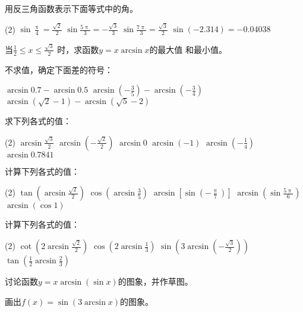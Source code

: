 \begin{Exercise}
\begin{question}
    \item 用反三角函数表示下面等式中的角。
\begin{tasks}(2)
    \task $\sin\frac{\uppi}{4}=\frac{\sqrt{2}}{2}$
    \task $\sin\frac{5\uppi}{3}=-\frac{\sqrt{3}}{3}$
    \task $\sin\frac{7\uppi}{3}=\frac{\sqrt{3}}{2}$
    \task $\sin(-2.314)=-0.04038$
\end{tasks}
    \item 当$\frac{1}{2}\leqslant x\le\frac{\sqrt{3}}{2}$
    时，求函数$y=x\arcsin x$的最大值
    和最小值。
    \item 不求值，确定下面差的符号：
\begin{tasks}
    \task $\arcsin 0.7-\arcsin 0.5$
    \task $\arcsin\left(-\frac{3}{5}\right)-\arcsin\left(-\frac{3}{4}\right)$
    \task $\arcsin\left(\sqrt{2}-1\right)-\arcsin\left(\sqrt{5}-2\right)$
\end{tasks}
\item 求下列各式的值：
\begin{tasks}(2)
    \task $\arcsin\frac{\sqrt{3}}{2}$
    \task $\arcsin\left(-\frac{\sqrt{2}}{2}\right)$
    \task $\arcsin0$
    \task $\arcsin(-1)$
    \task $\arcsin\left(-\frac{1}{4}\right)$
    \task $\arcsin0.7841$
\end{tasks}

\item 计算下列各式的值：
    \begin{tasks}(2)
        \task $\tan\left(\arcsin\frac{\sqrt{2}}{2}\right)$
        \task $\cos\left(\arcsin \frac{3}{5}\right)$
        \task $\arcsin \left[\sin\left(-\frac{\uppi}{7}\right)\right]$
        \task $\arcsin\left(\sin\frac{5\uppi}{6}\right)$
        \task $\arcsin(\cos1)$
    \end{tasks}
    \item 计算下列各式的值：
    \begin{tasks}(2)
        \task $\cot\left(2\arcsin\frac{\sqrt{2}}{2}\right)$
        \task $\cos\left(2\arcsin\frac{1}{3}\right)$
        \task $\sin\left(3\arcsin\left(-\frac{\sqrt{3}}{2}\right)\right)$
        \task $\tan\left(\frac{1}{2}\arcsin\frac{2}{3}\right)$
    \end{tasks}

    \item 讨论函数$y=x \arcsin(\sin x)$的图象，并作草图。
\item 画出$f(x)=\sin(3\arcsin x)$的图象。
\end{question}
\end{Exercise}

